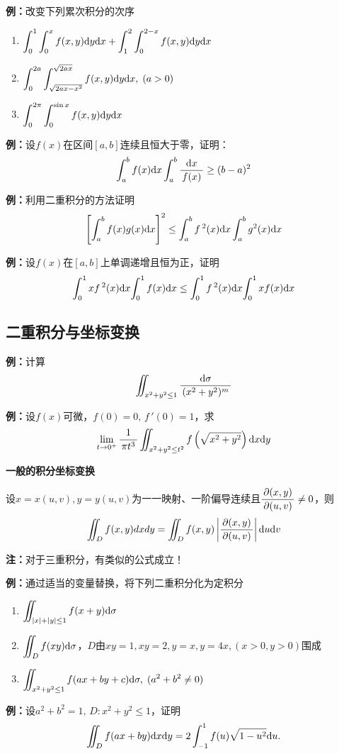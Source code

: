 {\bf 例：}改变下列累次积分的次序
\begin{enumerate}[(1)]
  \setlength{\itemindent}{1cm}
  \item $\displaystyle\int_0^1\displaystyle\int_0^xf(x,y)\mathrm{d}
  y\mathrm{d} x+\displaystyle\int_1^2\displaystyle\int_0^{2-x}f(x,y)\mathrm{d} y\mathrm{d} x$
  \item $\displaystyle\int_0^{2a}\displaystyle\int_{\sqrt{2ax-x^2}}^{\sqrt{2ax}}
  f(x,y)\mathrm{d} y\mathrm{d} x,\;(a>0)$ 
  \item $\displaystyle\int_0^{2\pi}\displaystyle\int_0^{\sin x}f(x,y)\mathrm{d} y\mathrm{d} x$
\end{enumerate}

{\bf 例：}设$f(x)$在区间$[a,b]$连续且恒大于零，证明：
$$\displaystyle\int_a^bf(x)\mathrm{d} x\displaystyle\int_a^b\displaystyle\frac{\,{\mathrm{d} x}\,}{\,{f(x)}\,}\geq (b-a)^2$$

{\bf 例：}利用二重积分的方法证明
$$\left[\displaystyle\int_a^bf(x)g(x)\mathrm{d} x\right]^2\leq
\displaystyle\int_a^bf\,^2(x)\mathrm{d} x\displaystyle\int_a^bg^2(x)\mathrm{d} x$$

{\bf 例：}设$f(x)$在$[a,b]$上单调递增且恒为正，证明
$${\displaystyle\int_0^1xf\,^2(x)\mathrm{d} x}{\displaystyle\int_0^1f(x)\mathrm{d} x}\leq
{\ensuremath{\displaystyle\int}_0^1f\,^2(x)\mathrm{d}x}{\ensuremath{\displaystyle\int}_0^1xf(x)\mathrm{d}x}$$

\subsection{二重积分与坐标变换}

{\bf 例：}计算
$$\iint_{x^2+y^2\leq 1}\displaystyle\frac{\,{\mathrm{d}\sigma}\,}{\,{(x^2+y^2)^m}\,}$$

{\bf 例：}设$f(x)$可微，$f(0)=0,\,f\,'(0)=1$，求
$$\lim\limits_{t\to 0^+}\displaystyle\frac{\,{1}\,}{\,{\pi t^3}\,}
\iint_{x^2+y^2\leq t^2}f\left(
\sqrt{x^2+y^2}\right)\mathrm{d} x\mathrm{d} y$$

{\bf 一般的积分坐标变换}

设$x=x(u,v),y=y(u,v)$为一一映射、一阶偏导连续且$\displaystyle\frac{\,{\partial(x,y)}\,}{\,{\partial(u,v)}\,}\ne0$，则
$$\iint_Df(x,y)dxdy=\iint_D f(x,y)\left|\displaystyle\frac{\,{\partial(x,y)}\,}{\,{\partial(u,v)}\,}\right|
\mathrm{d} u\mathrm{d} v$$

{\bf 注：}对于三重积分，有类似的公式成立！

{\bf 例：}通过适当的变量替换，将下列二重积分化为定积分 
\begin{enumerate}[(1)]
  \setlength{\itemindent}{1cm}
  \item $\displaystyle\iint_{|x|+|y|\leq 1}f(x+y)\mathrm{d}\sigma$ 
  \item $\displaystyle\iint_Df(xy)\mathrm{d}\sigma$，$D$由$xy=1,xy=2,y=x,y=4x,(x>0,y>0)$围成 
  \item $\displaystyle\iint_{x^2+y^2\leq 1} f(ax+by+c)\mathrm{d}\sigma,\;(a^2+b^2\ne 0)$
\end{enumerate}

{\bf 例：}设$a^2+b^2=1,\, D:x^2+y^2\leq 1$，证明
$$\iint_Df(ax+by)\mathrm{d} x\mathrm{d} y=2\displaystyle\int_{-1}^1f(u)\sqrt{1-u^2}\mathrm{d} u.$$

